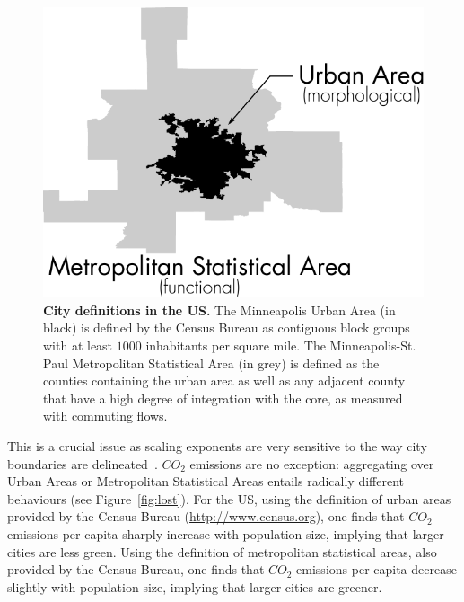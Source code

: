 \begin{figure}
    \centering
    \includegraphics[width=\textwidth]{gfx/chapter-scaling/city_definition.pdf}
    \caption{{\bf City definitions in the US.} The Minneapolis Urban Area (in
    black) is defined by the Census Bureau as contiguous block groups with at
least $1000$ inhabitants per square mile. The Minneapolis-St. Paul Metropolitan
Statistical Area (in grey) is defined as the counties containing the urban area
as well as any adjacent county that have a high degree of integration with the
core, as measured with commuting flows.\label{fig:two_definitions}}
\end{figure}


This is a crucial issue as scaling exponents are very sensitive to the
way city boundaries are delineated~\cite{Arcaute:2014}.  $CO_2$ emissions are no exception:
aggregating over Urban Areas or Metropolitan Statistical Areas entails radically
different behaviours (see Figure~\ref{fig:lost}). For the US, using the
definition of urban areas provided by the Census Bureau
(\url{http://www.census.org}), one finds that $CO_2$ emissions per capita
sharply increase with population size, implying that larger cities are less
green. Using the definition of metropolitan statistical areas, also provided by
the Census Bureau, one finds that $CO_2$ emissions per capita decrease slightly
with population size, implying that larger cities are greener.\\

